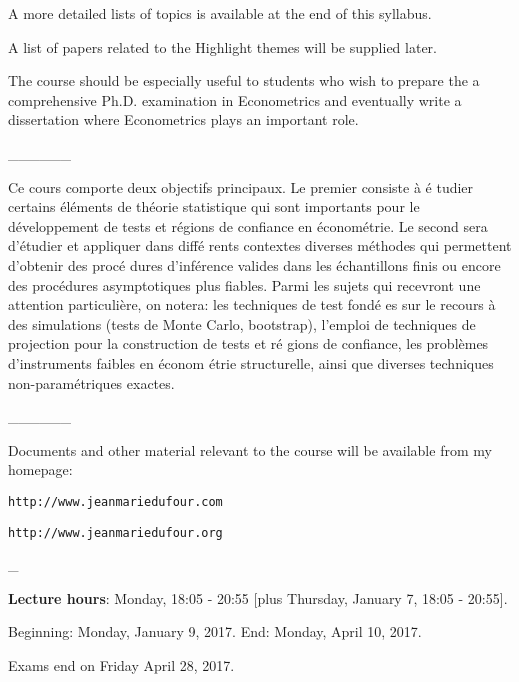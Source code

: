 \documentclass[titlepage,11pt,amstex]{article}
\begin{document}
\noindent A more detailed lists of topics is available at the end of this
syllabus.

\noindent A list of papers related to the Highlight themes will be supplied
later.

\noindent The course should be especially useful to students who wish to
prepare the a comprehensive Ph.D. examination in Econometrics and eventually
write a dissertation where Econometrics plays an important role.

\begin{center}
\_\_\_\_\_\_
\end{center}

Ce cours comporte deux objectifs principaux. Le premier consiste \`{a} \'{e}%
tudier certains \'{e}l\'{e}ments de th\'{e}orie statistique qui sont
importants pour le d\'{e}veloppement de tests et r\'{e}gions de confiance en 
\'{e}conom\'{e}trie. Le second sera d'\'{e}tudier et appliquer dans diff\'{e}%
rents contextes diverses m\'{e}thodes qui permettent d'obtenir des proc\'{e}%
dures d'inf\'{e}rence valides dans les \'{e}chantillons finis ou encore des
proc\'{e}dures asymptotiques plus fiables. Parmi les sujets qui recevront
une attention particuli\`{e}re, on notera: les techniques de test fond\'{e}%
es sur le recours \`{a} des simulations (tests de Monte Carlo, bootstrap),
l'emploi de techniques de projection pour la construction de tests et r\'{e}%
gions de confiance, les probl\`{e}mes d'instruments faibles en \'{e}conom%
\'{e}trie structurelle, ainsi que diverses techniques non-param\'{e}triques
exactes.

\quad

\begin{center}
\_\_\_\_\_\_
\end{center}

\noindent Documents and other material relevant to the course will be
available from my homepage:

\quad

\begin{center}
\texttt{http://www.jeanmariedufour.com}

\texttt{http://www.jeanmariedufour.org}

\_
\end{center}

\noindent \textbf{Lecture hours}: Monday, 18:05 - 20:55 [plus Thursday,
January 7, 18:05 - 20:55].

Beginning: Monday, January 9, 2017. End: Monday, April 10, 2017.

Exams end on Friday April 28, 2017.
\end{document}
